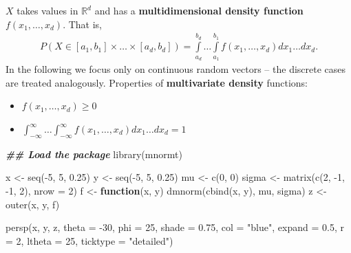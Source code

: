\documentclass[
  14pt,
]{memoir}
\newenvironment{Shaded}{\begin{snugshade}}{\end{snugshade}}
\newcommand{\AttributeTok}[1]{\textcolor[rgb]{0.77,0.63,0.00}{#1}}
\newcommand{\ControlFlowTok}[1]{\textcolor[rgb]{0.13,0.29,0.53}{\textbf{#1}}}
\newcommand{\DecValTok}[1]{\textcolor[rgb]{0.00,0.00,0.81}{#1}}
\newcommand{\DocumentationTok}[1]{\textcolor[rgb]{0.56,0.35,0.01}{\textbf{\textit{#1}}}}
\newcommand{\FloatTok}[1]{\textcolor[rgb]{0.00,0.00,0.81}{#1}}
\newcommand{\FunctionTok}[1]{\textcolor[rgb]{0.00,0.00,0.00}{#1}}
\newcommand{\NormalTok}[1]{#1}
\newcommand{\OtherTok}[1]{\textcolor[rgb]{0.56,0.35,0.01}{#1}}
\newcommand{\SpecialCharTok}[1]{\textcolor[rgb]{0.00,0.00,0.00}{#1}}
\newcommand{\StringTok}[1]{\textcolor[rgb]{0.31,0.60,0.02}{#1}}
\begin{document}
\(X\) takes values in \(\mathbb{R}^d\) and has a \textbf{multidimensional density function} \(f(x_1,\dots,x_d)\). That is,
\begin{align*}
P(X\in [a_1,b_1]\times\dots\times [a_d,b_d])=\int\limits_{a_d}^{b_d}\dots \int\limits _{a_1}^{b_1}f(x_1,\dots,x_d)dx_1\dots dx_d.
\end{align*}
In the following we focus only on continuous random vectors -- the discrete cases are treated analogously. Properties of \textbf{multivariate density} functions:

\begin{itemize}
\item $\displaystyle f(x_1,\dots,x_d)\geq 0$\par\noindent
\item $\displaystyle \int_{-\infty}^{\infty}\dots \int_{-\infty}^{\infty}f(x_1,\dots,x_d)dx_1\dots dx_d=1$
\end{itemize}

\begin{Shaded}
\begin{Highlighting}[]
\DocumentationTok{\#\# Load the package}
\FunctionTok{library}\NormalTok{(mnormt)}

\NormalTok{x     }\OtherTok{\textless{}{-}} \FunctionTok{seq}\NormalTok{(}\SpecialCharTok{{-}}\DecValTok{5}\NormalTok{, }\DecValTok{5}\NormalTok{, }\FloatTok{0.25}\NormalTok{) }
\NormalTok{y     }\OtherTok{\textless{}{-}} \FunctionTok{seq}\NormalTok{(}\SpecialCharTok{{-}}\DecValTok{5}\NormalTok{, }\DecValTok{5}\NormalTok{, }\FloatTok{0.25}\NormalTok{)}
\NormalTok{mu    }\OtherTok{\textless{}{-}} \FunctionTok{c}\NormalTok{(}\DecValTok{0}\NormalTok{, }\DecValTok{0}\NormalTok{)}
\NormalTok{sigma }\OtherTok{\textless{}{-}} \FunctionTok{matrix}\NormalTok{(}\FunctionTok{c}\NormalTok{(}\DecValTok{2}\NormalTok{, }\SpecialCharTok{{-}}\DecValTok{1}\NormalTok{, }\SpecialCharTok{{-}}\DecValTok{1}\NormalTok{, }\DecValTok{2}\NormalTok{), }\AttributeTok{nrow =} \DecValTok{2}\NormalTok{)}
\NormalTok{f     }\OtherTok{\textless{}{-}} \ControlFlowTok{function}\NormalTok{(x, y) }\FunctionTok{dmnorm}\NormalTok{(}\FunctionTok{cbind}\NormalTok{(x, y), mu, sigma)}
\NormalTok{z     }\OtherTok{\textless{}{-}} \FunctionTok{outer}\NormalTok{(x, y, f)}

\FunctionTok{persp}\NormalTok{(x, y, z, }\AttributeTok{theta =} \SpecialCharTok{{-}}\DecValTok{30}\NormalTok{, }\AttributeTok{phi =} \DecValTok{25}\NormalTok{, }
      \AttributeTok{shade =} \FloatTok{0.75}\NormalTok{, }\AttributeTok{col =} \StringTok{"blue"}\NormalTok{, }\AttributeTok{expand =} \FloatTok{0.5}\NormalTok{, }\AttributeTok{r =} \DecValTok{2}\NormalTok{, }
      \AttributeTok{ltheta =} \DecValTok{25}\NormalTok{, }\AttributeTok{ticktype =} \StringTok{"detailed"}\NormalTok{)}
\end{Highlighting}
\end{Shaded}
\end{document}
